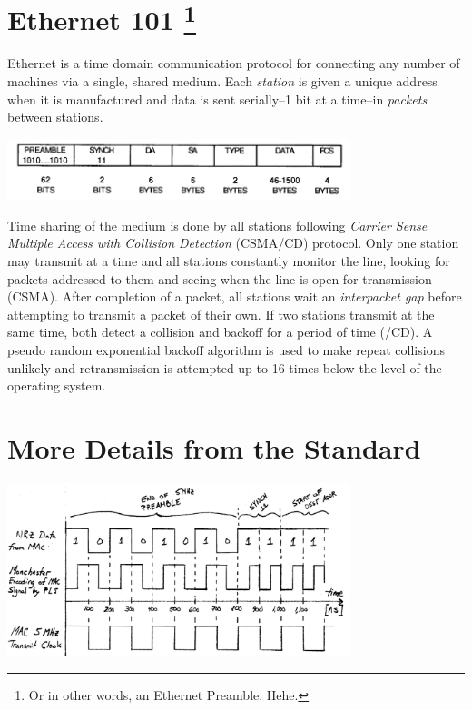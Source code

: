 ﻿\documentclass{article}
\begin{document}
\section[title]{Ethernet 101 \footnote{Or in other words, an Ethernet Preamble. Hehe.}}

Ethernet is a time domain communication protocol for connecting any number of
machines via a single, shared medium.
Each \textit{station} is given a unique address when it is manufactured and
data is sent serially--1 bit at a time--in \textit{packets} between
stations.

\begin{center}
	\includegraphics[width=0.75\textwidth]{ethernet-packet.pdf}
	\label{packet-format}
\end{center}

Time sharing of the medium is done by all stations following
\textit{Carrier Sense Multiple Access with Collision Detection}
(CSMA/CD) protocol.
Only one station may transmit at a time and all stations constantly
monitor the line, looking for packets addressed to them and seeing when
the line is open for transmission (CSMA).
After completion of a packet, all stations wait an
\textit{interpacket gap} before attempting to transmit a packet of their own.
If two stations transmit at the same time, both detect a collision
and backoff for a period of time (/CD).
A pseudo random exponential backoff algorithm is used to make repeat
collisions unlikely and retransmission is attempted up to 16 times
below the level of the operating system.

\section{More Details from the Standard}

\begin{center}
	\includegraphics[width=0.75\textwidth]{timing-diagram.pdf}
	\label{timing-diagram}
\end{center}
\end{document}
